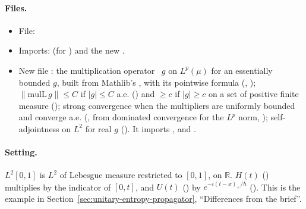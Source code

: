 \documentclass[11pt]{article}
\begin{document}
\paragraph{Files.}\leavevmode
\begin{itemize}
\item File: 
\item Imports:  (for
  ) and the new
  .
\item New  file
  : the multiplication
  operator ~$g$ on $L^p(\mu)$ for an essentially bounded $g$, built from Mathlib's
  , with its pointwise formula (,
  ); $\|\mathrm{mulL}\,g\| \le C$ if $|g| \le C$ a.e.
  () and $\ge c$ if $|g| \ge c$ on a set of positive finite measure
  (); strong convergence when the multipliers are uniformly bounded and
  converge a.e. (, from dominated convergence for the $L^p$ norm,
  ); self-adjointness on $L^2$ for real $g$
  (). It imports ,
   and .
\end{itemize}

\paragraph{Setting.} $L^2[0,1]$ is $L^2$ of Lebesgue measure restricted to $[0,1]$, on
$\mathbb{R}$. $H(t)$ () multiplies by the indicator of $[0,t]$, and
$U(t)$ () by $e^{-i(t-x)_+/\hbar}$ (). This is the
example in Section~\ref{sec:unitary-entropy-propagator}, ``Differences from the brief''.
\end{document}
